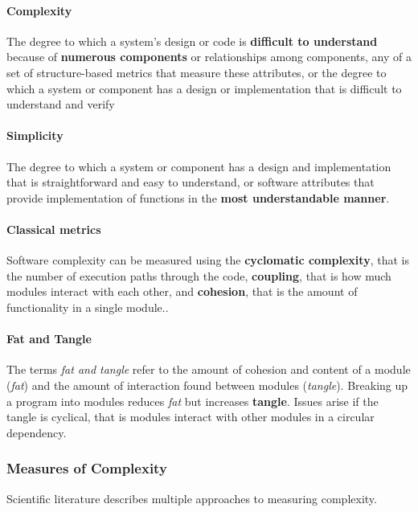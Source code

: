 \paragraph{Complexity} %
\label{par:complexity}
The degree to which a system's design or code is \textbf{difficult to understand} because of \textbf{numerous components} or relationships among components, any of a set of structure-based metrics that measure these attributes, or the degree to which a system or component has a design or implementation that is difficult to understand and verify

\paragraph{Simplicity} %
\label{par:simplicity}
The degree to which a system or component has a design and implementation that is straightforward and easy to understand, or software attributes that provide implementation of functions in the \textbf{most understandable manner}.

\paragraph{Classical metrics} %
\label{par:classical_metrics}
Software complexity can be measured using the \textbf{cyclomatic complexity}, that is the number of execution paths through the code, \textbf{coupling}, that is how much modules interact with each other, and \textbf{cohesion}, that is the amount of functionality in a single module..

\paragraph{Fat and Tangle} %
\label{par:fat_and_tangle}

The terms \emph{fat and tangle} refer to the amount of cohesion and content of a module (\emph{fat}) and the amount of interaction found between modules (\emph{tangle}). Breaking up a program into modules reduces \emph{fat} but increases \textbf{tangle}. Issues arise if the tangle is cyclical, that is modules interact with other modules in a circular dependency.

\subsubsection{Measures of Complexity} %
\label{ssub:measures_of_complexity}
Scientific literature describes multiple approaches to measuring complexity.

